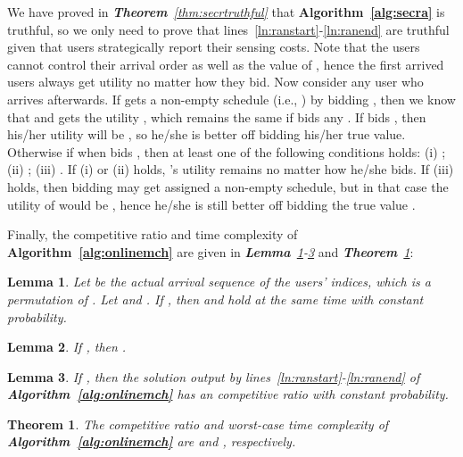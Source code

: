 \documentclass[10pt,journal,compsoc]{IEEEtran}
\newtheorem{theorem}{\textbf{Theorem}}
\newtheorem{lemma}{\textbf{Lemma}}
\begin{document}
\begin{IEEEproof}
    We have proved in \textit{\textbf{Theorem}~\ref{thm:secrtruthful}} that \textbf{Algorithm~\ref{alg:secra}} is truthful, so we only need to prove that lines~\ref{ln:ranstart}-\ref{ln:ranend} are truthful given that users strategically report their sensing costs. Note that the users cannot control their arrival order as well as the value of , hence the first arrived  users always get utility  no matter how they bid. Now consider any user  who arrives afterwards. If  gets a non-empty schedule (i.e., ) by bidding , then we know that  and  gets the utility , which remains the same if  bids any . If  bids , then his/her utility will be , so he/she is better off bidding his/her true value. Otherwise if  when  bids , then at least one of the following conditions holds: (i) ; (ii) ; (iii) . If (i) or (ii) holds, 's utility remains  no matter how he/she bids. If (iii) holds, then bidding  may get  assigned a non-empty schedule, but in that case the utility of  would be , hence he/she is still better off bidding the true value .
  \end{IEEEproof}

  Finally, the competitive ratio and time complexity of \textbf{Algorithm~\ref{alg:onlinemch}} are given in \textit{\textbf{Lemma}~\ref{lma:deltabound}-\ref{lma:onlmchparta}} and \textit{\textbf{Theorem}~\ref{thm:artimcom}}:



  \begin{lemma}
    Let  be the actual arrival sequence of the users' indices, which is a permutation of . Let  and . If , then  and  hold at the same time with constant probability.
\label{lma:deltabound}
  \end{lemma}
\begin{lemma}
    If , then .
    \label{lma:boundapx}
  \end{lemma}
\begin{lemma}
    If , then the solution output by lines~\ref{ln:ranstart}-\ref{ln:ranend} of \textbf{Algorithm~\ref{alg:onlinemch}} has an  competitive ratio with constant probability.
  \label{lma:onlmchparta}
  \end{lemma}
\begin{theorem}
    The competitive ratio and worst-case time complexity of \textbf{Algorithm~\ref{alg:onlinemch}} are  and , respectively.
    \label{thm:artimcom}
  \end{theorem}
\end{document}
